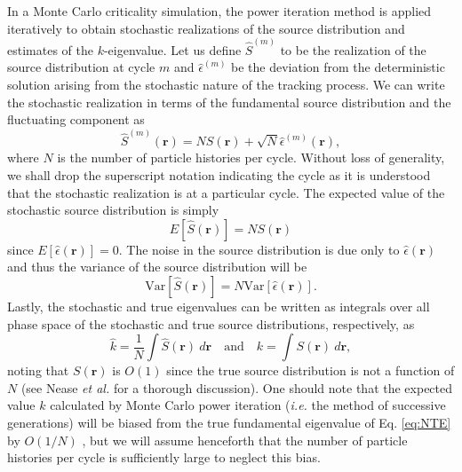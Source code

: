 \documentclass[11pt]{article}
\begin{document}
In a Monte Carlo criticality simulation, the power iteration method is
applied iteratively to obtain stochastic realizations of the source
distribution and estimates of the $k$-eigenvalue. Let us define
$\hat{S}^{(m)}$ to be the realization of the source distribution at
cycle $m$ and $\hat{\epsilon}^{(m)}$ be the deviation from the
deterministic solution arising from the stochastic nature of the
tracking process. We can write the stochastic realization in terms of
the fundamental source distribution and the fluctuating component as
\cite{brissenden}
\begin{equation}\label{eq:source}
  \hat{S}^{(m)}(\mathbf{r})= N S(\mathbf{r}) + \sqrt{N}
  \hat{\epsilon}^{(m)}(\mathbf{r}),
\end{equation}
where $N$ is the number of particle histories per cycle. Without loss
of generality, we shall drop the superscript notation indicating the
cycle as it is understood that the stochastic realization is at a
particular cycle. The expected value of the stochastic source
distribution is simply
\begin{equation}
  E \left[ \hat{S}(\mathbf{r})\right] = N S (\mathbf{r})
\end{equation}
since $E \left[ \hat{\epsilon}(\mathbf{r})\right] = 0$. The noise in
the source distribution is due only to $\hat{\epsilon}(\mathbf{r})$
and thus the variance of the source distribution will be
\begin{equation}
  \text{Var} \left[ \hat{S}(\mathbf{r})\right] = N \text{Var} \left[
    \hat{\epsilon}(\mathbf{r}) \right].
\end{equation}
Lastly, the stochastic and true eigenvalues can be written as
integrals over all phase space of the stochastic and true source
distributions, respectively, as
\begin{equation}\label{eq:k_to_source}
  \hat{k} = \frac{1}{N} \int \hat{S}(\mathbf{r}) \: d\mathbf{r} \quad
  \text{and} \quad k = \int S(\mathbf{r}) \: d\mathbf{r},
\end{equation}
noting that $S(\mathbf{r})$ is $O(1)$ since the true source
distribution is not a function of $N$ (see Nease {\em et al.}
\cite{nease} for a thorough discussion). One should note that the
expected value $k$ calculated by Monte Carlo power iteration
(\emph{i.e.} the method of successive generations) will be biased from
the true fundamental eigenvalue of Eq. \ref{eq:NTE} by $O(1/N)$
\cite{brissenden}, but we will assume henceforth that the number of
particle histories per cycle is sufficiently large to neglect this
bias.
\end{document}
